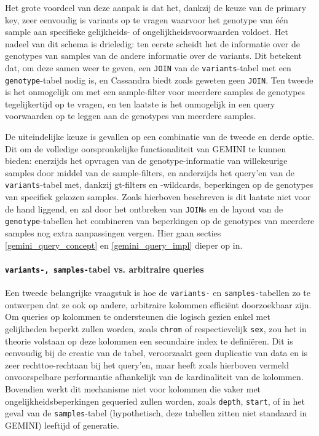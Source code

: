\begin{itemize}
Het grote voordeel van deze aanpak is dat het, dankzij de keuze van de primary key, zeer eenvoudig is variants op te vragen waarvoor het genotype van \'e\'en sample aan specifieke gelijkheids- of ongelijkheidsvoorwaarden voldoet. Het nadeel van dit schema is drieledig: ten eerste scheidt het de informatie over de genotypes van samples van de andere informatie over de variants. Dit betekent dat, om deze samen weer te geven, een \texttt{JOIN} van de \texttt{variants}-tabel met een \texttt{genotype}-tabel nodig is, en Cassandra biedt zoals geweten geen \texttt{JOIN}. Ten tweede is het onmogelijk om met een sample-filter voor meerdere samples de genotypes tegelijkertijd op te vragen, en ten laatste is het onmogelijk in een query voorwaarden op te leggen aan de genotypes van meerdere samples.

\end{itemize}

De uiteindelijke keuze is gevallen op een combinatie van de tweede en derde optie. Dit om de volledige oorspronkelijke functionaliteit van GEMINI te kunnen bieden: enerzijds het opvragen van de genotype-informatie van willekeurige samples door middel van de sample-filters, en anderzijds het query'en van de \texttt{variants}-tabel met, dankzij gt-filters en -wildcards, beperkingen op de genotypes van specifiek gekozen samples. Zoals hierboven beschreven is dit laatste niet voor de hand liggend, en zal door het ontbreken van \texttt{JOIN}s en de layout van de \texttt{genotype}-tabellen het combineren van beperkingen op de genotypes van meerdere samples nog extra aanpassingen vergen. Hier gaan secties \ref{gemini_query_concept} en \ref{gemini_query_impl} dieper op in.

\paragraph{\texttt{variants-, samples-}tabel vs. arbitraire queries}

Een tweede belangrijke vraagstuk is hoe de \texttt{variants-} en \texttt{samples-}tabellen zo te ontwerpen dat ze ook op andere, arbitraire kolommen effici\"ent doorzoekbaar zijn.\\
Om queries op kolommen te ondersteunen die logisch gezien enkel met gelijkheden beperkt zullen worden, zoals \texttt{chrom} of respectievelijk \texttt{sex}, zou het in theorie volstaan op deze kolommen een secundaire index te defini\"eren. Dit is eenvoudig bij de creatie van de tabel, veroorzaakt geen duplicatie van data en is zeer rechttoe-rechtaan bij het query'en, maar heeft zoals hierboven vermeld onvoorspelbare performantie afhankelijk van de kardinaliteit van de kolommen. Bovendien werkt dit mechanisme niet voor kolommen die vaker met ongelijkheidsbeperkingen gequeried zullen worden, zoals \texttt{depth}, \texttt{start}, of in het geval van de \texttt{samples}-tabel (hypothetisch, deze tabellen zitten niet standaard in GEMINI) leeftijd of generatie.\\

